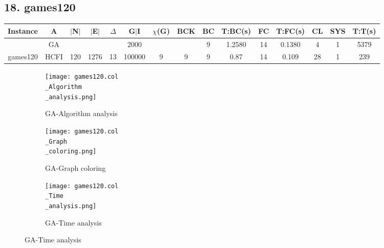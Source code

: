\documentclass[10pt]{article}
\begin{document}
\subsection*{\hspace{0,9073976cm} 18. games120}
\begin{table}[H]
\centering
\begin{tabular}{|c|c|c|c|c|c|c|c|c|c|c|c|c|c|c|}
\hline
Instance& A &$|$N$|$ & $|$E$|$ & $\Delta$ & G$|$I & $\chi$(G) &BCK&BC & T:BC(s) & FC & T:FC(s) & CL & SYS & T:T(s) \\ \hline \hline
&GA&       &                   &                     &2000         &     \cellcolor{yellow} & {\cellcolor{yellow}}& {{\cellcolor{green}9}}
&1.2580   &14        &0.1380                   & 4                   &1          &5379        \\ \cline{2-2} \cline{6-6} \cline{9-15}
 \multirow{-2}{*}{games120} &HCFI   &\multirow{-2}{*}{120}   &\multirow{-2}{*}{1276}     &\multirow{-2}{*}{13}     &100000     &\multirow{-2}{*}{\cellcolor{yellow}9}      & \multirow{-2}{*}{\cellcolor{yellow}9}    &{\cellcolor{green}9}     &0.87         &14    &0.109         &28    &1     &239        \\ \hline 
\end{tabular}
\end{table}
\graphicspath{{./Core1/Solutions/GA/games120.col}}
\begin{figure}[H]
\begin{subfigure}{.33\textwidth}
  \centering
  \texttt{[image: games120.col\\\_Algorithm\\\_analysis.png]}
  \caption{GA-Algorithm analysis}
   \label{fig:subfig1}
\end{subfigure}%
\begin{subfigure}{.33\textwidth}
  \centering
  \texttt{[image: games120.col\\\_Graph\\\_coloring.png]}
  \caption{GA-Graph coloring}
  \label{fig:subfig2}
\end{subfigure}
\begin{subfigure}{.33\textwidth}
  \centering
  \texttt{[image: games120.col\\\_Time\\\_analysis.png]}
  \caption{GA-Time analysis}
  \end{subfigure}
\end{figure}
\end{document}
